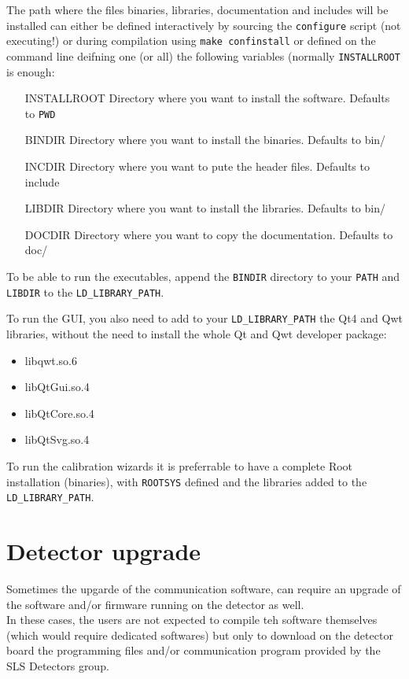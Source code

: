 \documentclass{article}
\begin{document}
The path where the files binaries, libraries, documentation and includes  will be installed can either be defined interactively by sourcing the  \verb=configure= script (not executing!) or during compilation using \verb=make confinstall= or defined on the command line deifning one (or all) the following variables (normally \verb=INSTALLROOT= is enough:
\begin{itemize}
\item[INSTALLROOT] Directory where you want to install the software. Defaults to \verb=PWD= 
\item[BINDIR] Directory where you want to install the binaries. Defaults to bin/
\item[INCDIR] Directory where you want to pute the header files. Defaults to include
\item[LIBDIR] Directory where you want to install the libraries. Defaults to bin/
\item[DOCDIR] Directory where you want to copy the documentation. Defaults to doc/
\end{itemize}



To be able to run the executables, append the \verb=BINDIR= directory to your \verb=PATH= and \verb=LIBDIR= to the \verb=LD_LIBRARY_PATH=.

To run the GUI, you also need to add to your \verb=LD_LIBRARY_PATH= the Qt4 and Qwt libraries, without the need to install the whole Qt and Qwt developer package:
\begin{itemize}
\item libqwt.so.6 
\item libQtGui.so.4 
\item libQtCore.so.4 
\item libQtSvg.so.4 
\end{itemize}

To run the calibration wizards it is preferrable to have a complete Root installation (binaries), with \verb=ROOTSYS= defined and the libraries added to the \verb=LD_LIBRARY_PATH=.


\section{Detector upgrade}

Sometimes the upgarde of the communication software, can require an upgrade of the software and/or firmware running on the detector as well.\\
In these cases, the users are not expected to compile teh software themselves (which would require dedicated softwares) but only to download on the detector board the programming files and/or communication program provided by the SLS Detectors group.
\end{document}

